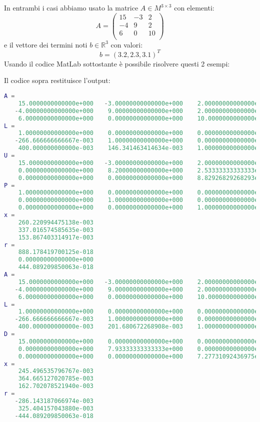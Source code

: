 \begin{flushleft}
In entrambi i casi abbiamo usato la matrice $A\in M^{3\times 3}$ con elementi:
\[ 
A =
\begin{pmatrix}
    15  & -3 &  2 \\
   -4  &  9  &  2 \\
    6  &  0  &  10 \\
\end{pmatrix}
\]
e il vettore dei termini noti $b\in \mathbb{R}^3$ con valori:
\[
{b} = (3.2, 2.3, 3.1)^T
\]
Usando il codice MatLab sottostante è possibile risolvere questi 2 esempi:

Il codice sopra restituisce l'output:
\begin{lstlisting}[language=matlab, basicstyle = \small]
A =
    15.0000000000000e+000   -3.00000000000000e+000    2.00000000000000e+000
   -4.00000000000000e+000    9.00000000000000e+000    2.00000000000000e+000
    6.00000000000000e+000    0.00000000000000e+000    10.0000000000000e+000
L =
    1.00000000000000e+000    0.00000000000000e+000    0.00000000000000e+000
   -266.666666666667e-003    1.00000000000000e+000    0.00000000000000e+000
    400.000000000000e-003    146.341463414634e-003    1.00000000000000e+000
U =
    15.0000000000000e+000   -3.00000000000000e+000    2.00000000000000e+000
    0.00000000000000e+000    8.20000000000000e+000    2.53333333333333e+000
    0.00000000000000e+000    0.00000000000000e+000    8.82926829268293e+000
P =
    1.00000000000000e+000    0.00000000000000e+000    0.00000000000000e+000
    0.00000000000000e+000    1.00000000000000e+000    0.00000000000000e+000
    0.00000000000000e+000    0.00000000000000e+000    1.00000000000000e+000
x =
    260.220994475138e-003
    337.016574585635e-003
    153.867403314917e-003
r =
    888.178419700125e-018
    0.00000000000000e+000
    444.089209850063e-018
A =
    15.0000000000000e+000   -3.00000000000000e+000    2.00000000000000e+000
   -4.00000000000000e+000    9.00000000000000e+000    2.00000000000000e+000
    6.00000000000000e+000    0.00000000000000e+000    10.0000000000000e+000
L =
    1.00000000000000e+000    0.00000000000000e+000    0.00000000000000e+000
   -266.666666666667e-003    1.00000000000000e+000    0.00000000000000e+000
    400.000000000000e-003    201.680672268908e-003    1.00000000000000e+000
D =
    15.0000000000000e+000    0.00000000000000e+000    0.00000000000000e+000
    0.00000000000000e+000    7.93333333333333e+000    0.00000000000000e+000
    0.00000000000000e+000    0.00000000000000e+000    7.27731092436975e+000
x =
    245.496535796767e-003
    364.665127020785e-003
    162.702078521940e-003
r =
   -286.143187066974e-003
    325.404157043880e-003
   -444.089209850063e-018
\end{lstlisting}
\end{flushleft}
